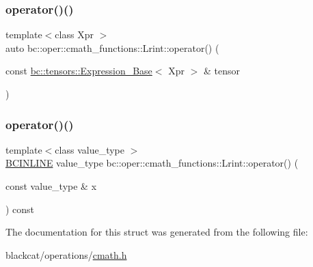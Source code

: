 \mbox{\label{structbc_1_1oper_1_1cmath__functions_1_1Lrint_a812409c293c9b7c2237010a1d3e15154}} 
\subsubsection{\texorpdfstring{operator()()}{operator()()}\hspace{0.1cm}{\footnotesize\ttfamily [2/3]}}
{\footnotesize\ttfamily template$<$class Xpr $>$ \\
auto bc\+::oper\+::cmath\+\_\+functions\+::\+Lrint\+::operator() (\begin{DoxyParamCaption}\item[{const \hyperlink{classbc_1_1tensors_1_1Expression__Base}{bc\+::tensors\+::\+Expression\+\_\+\+Base}$<$ Xpr $>$ \&}]{tensor }\end{DoxyParamCaption})\hspace{0.3cm}{\ttfamily [inline]}}

\mbox{\label{structbc_1_1oper_1_1cmath__functions_1_1Lrint_a6e07d364a44ba2cb660cd8192d1ebe7e}} 
\subsubsection{\texorpdfstring{operator()()}{operator()()}\hspace{0.1cm}{\footnotesize\ttfamily [3/3]}}
{\footnotesize\ttfamily template$<$class value\+\_\+type $>$ \\
\hyperlink{common_8h_a6699e8b0449da5c0fafb878e59c1d4b1}{B\+C\+I\+N\+L\+I\+NE} value\+\_\+type bc\+::oper\+::cmath\+\_\+functions\+::\+Lrint\+::operator() (\begin{DoxyParamCaption}\item[{const value\+\_\+type \&}]{x }\end{DoxyParamCaption}) const\hspace{0.3cm}{\ttfamily [inline]}}



The documentation for this struct was generated from the following file\+:\begin{DoxyCompactItemize}
\item 
blackcat/operations/\hyperlink{cmath_8h}{cmath.\+h}\end{DoxyCompactItemize}
